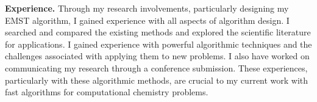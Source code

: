 \documentclass[twoside,leqno, 12pt]{article}
\begin{document}
\vspace{-0.18in}
\textbf{Experience.}  Through my research involvements, particularly designing my EMST algorithm, I 
gained experience with all aspects of algorithm design.  I searched and compared the existing methods and explored the scientific literature for applications.  I gained experience with powerful algorithmic techniques and the challenges associated with applying them to new problems.  I also have worked on communicating my research through a conference submission.  These experiences, particularly with these algorithmic methods, are crucial to my current work with fast algorithms for computational chemistry problems.





%
%
\end{document}
